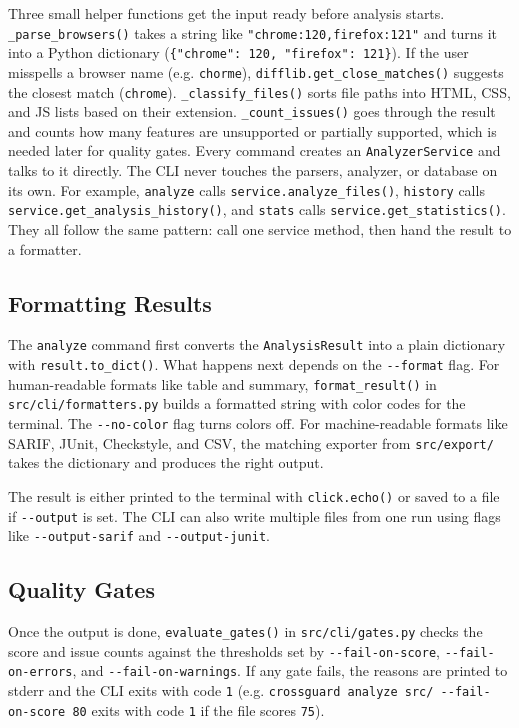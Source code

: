 Three small helper functions get the input ready before analysis starts. \texttt{\_parse\_browsers()} takes a string like \texttt{"chrome:120,firefox:121"} and turns it into a Python dictionary (\texttt{\{"chrome": 120, "firefox": 121\}}). If the user misspells a browser name (e.g. \texttt{chorme}), \texttt{difflib.get\_close\_matches()} suggests the closest match (\texttt{chrome}). \texttt{\_classify\_files()} sorts file paths into HTML, CSS, and JS lists based on their extension. \texttt{\_count\_issues()} goes through the result and counts how many features are unsupported or partially supported, which is needed later for quality gates. Every command creates an \texttt{AnalyzerService} and talks to it directly. The CLI never touches the parsers, analyzer, or database on its own. For example, \texttt{analyze} calls \texttt{service.analyze\_files()}, \texttt{history} calls \texttt{service.get\_analysis\_history()}, and \texttt{stats} calls \texttt{service.get\_statistics()}. They all follow the same pattern: call one service method, then hand the result to a formatter.

\subsection{Formatting Results}

The \texttt{analyze} command first converts the \texttt{AnalysisResult} into a plain dictionary with \texttt{result.to\_dict()}. What happens next depends on the \texttt{-{}-format} flag. For human-readable formats like table and summary, \texttt{format\_result()} in \texttt{src/cli/formatters.py} builds a formatted string with color codes for the terminal. The \texttt{-{}-no-color} flag turns colors off. For machine-readable formats like SARIF, JUnit, Checkstyle, and CSV, the matching exporter from \texttt{src/export/} takes the dictionary and produces the right output.

The result is either printed to the terminal with \texttt{click.echo()} or saved to a file if \texttt{-{}-output} is set. The CLI can also write multiple files from one run using flags like \texttt{-{}-output-sarif} and \texttt{-{}-output-junit}.

\subsection{Quality Gates}

Once the output is done, \texttt{evaluate\_gates()} in \texttt{src/cli/gates.py} checks the score and issue counts against the thresholds set by \texttt{-{}-fail-on-score}, \texttt{-{}-fail-on-errors}, and \texttt{-{}-fail-on-warnings}. If any gate fails, the reasons are printed to stderr and the CLI exits with code \texttt{1} (e.g. \texttt{crossguard analyze src/ -{}-fail-on-score 80} exits with code \texttt{1} if the file scores \texttt{75}).

